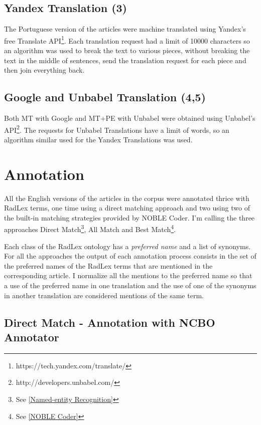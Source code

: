 \subsection{Yandex Translation (3)}

The Portuguese version of the articles were machine translated using Yandex's free Translate API\footnote{https://tech.yandex.com/translate/}. Each translation request had a limit of 10000 characters so an algorithm was used to break the text to various pieces, without breaking the text in the middle of sentences, send the translation request for each piece and then join everything back.

\subsection{Google and Unbabel Translation (4,5)}

Both MT with Google and MT+PE with Unbabel were obtained using Unbabel's API\footnote{http://developers.unbabel.com/}. The requests for Unbabel Translations have a limit of words, so an algorithm similar used for the Yandex Translations was used. 

\section{Annotation}

All the English versions of the articles in the corpus were annotated thrice with RadLex terms, one time using a direct matching approach and two using two of the built-in matching strategies provided by NOBLE Coder. I'm calling the three approaches Direct Match\footnote{See \ref{Named-entity Recognition}}, All Match and Best Match\footnote{See \ref{NOBLE Coder}}.

Each class of the RadLex ontology has a \textit{preferred name} and a list of synonyms. For all the approaches the output of each annotation process consists in the set of the preferred names of the RadLex terms that are mentioned in the corresponding article. I normalize all the mentions to the preferred name so that a use of the preferred name in one translation and the use of one of the synonyms in another translation are considered mentions of the same term. 

\subsection{Direct Match - Annotation with NCBO Annotator}

